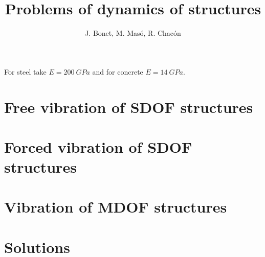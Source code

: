 \documentclass{problems}
\title[Dynamics of structures]{Problems of dynamics of structures}
\author{J. Bonet, M. Masó, R. Chacón}
\begin{document}
\maketitle

For steel take $E=\qty{200}{GPa}$ and for concrete $E=\qty{14}{GPa}$.

\section{Free vibration of SDOF structures}





\section{Forced vibration of SDOF structures}







\section{Vibration of MDOF structures}




\newpage
\section{Solutions}
\shipoutAnswer

{}
\printbibliography
\end{document}
